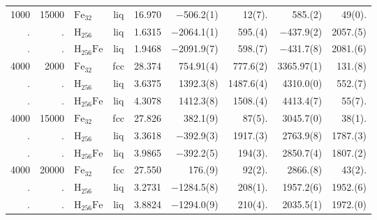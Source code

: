 \begin{table}[h]
\begin{adjustbox}{max width=\textwidth}
\begin{tabular}{rrlcrrrrr}
1000  &  15000  &  $\mathrm{Fe}_{32}$     &  liq  &  16.970  &  $-$506.2(1)\phantom{0}   &  12(7).\phantom{0(0)}   &  585.(2)\phantom{00}     &  49(0).\phantom{(0)}  \\
.     &  .      &  $\mathrm{H}_{256}$    &  liq  &  1.6315  &  $-$2064.1(1)\phantom{0}  &  595.(4)\phantom{0}     &  $-$437.9(2)\phantom{0}  &  2057.(5)             \\
.     &  .      &  $\mathrm{H}_{256}\mathrm{Fe}$  &  liq  &  1.9468  &  $-$2091.9(7)\phantom{0}  &  598.(7)\phantom{0}     &  $-$431.7(8)\phantom{0}  &  2081.(6)             \\
4000  &  2000   &  $\mathrm{Fe}_{32}$     &  fcc  &  28.374  &  754.91(4)                &  777.6(2)\phantom{0}    &  3365.97(1)              &  131.(8)              \\
.     &  .      &  $\mathrm{H}_{256}$    &  liq  &  3.6375  &  1392.3(8)\phantom{0}     &  1487.6(4)              &  4310.0(0)\phantom{0}    &  552.(7)              \\
.     &  .      &  $\mathrm{H}_{256}\mathrm{Fe}$  &  liq  &  4.3078  &  1412.3(8)\phantom{0}     &  1508.(4)\phantom{0}    &  4413.4(7)\phantom{0}    &  55(7).\phantom{(0)}  \\
4000  &  15000  &  $\mathrm{Fe}_{32}$     &  fcc  &  27.826  &  382.1(9)\phantom{0}      &  87(5).\phantom{0(0)}   &  3045.7(0)\phantom{0}    &  38(1).\phantom{(0)}  \\
.     &  .      &  $\mathrm{H}_{256}$    &  liq  &  3.3618  &  $-$392.9(3)\phantom{0}   &  1917.(3)\phantom{0}    &  2763.9(8)\phantom{0}    &  1787.(3)             \\
.     &  .      &  $\mathrm{H}_{256}\mathrm{Fe}$  &  liq  &  3.9865  &  $-$392.2(5)\phantom{0}   &  194(3).\phantom{0(0)}  &  2850.7(4)\phantom{0}    &  1807.(2)             \\
4000  &  20000  &  $\mathrm{Fe}_{32}$     &  fcc  &  27.550  &  176.(9)\phantom{00}      &  92(2).\phantom{0(0)}   &  2866.(8)\phantom{00}    &  43(2).\phantom{(0)}  \\
.     &  .      &  $\mathrm{H}_{256}$    &  liq  &  3.2731  &  $-$1284.5(8)\phantom{0}  &  208(1).\phantom{0(0)}  &  1957.2(6)\phantom{0}    &  1952.(6)             \\
.     &  .      &  $\mathrm{H}_{256}\mathrm{Fe}$  &  liq  &  3.8824  &  $-$1294.0(9)\phantom{0}  &  210(4).\phantom{0(0)}  &  2035.5(1)\phantom{0}    &  1972.(0)             \\
\hline
\end{tabular}%
\end{adjustbox}
\end{table}

